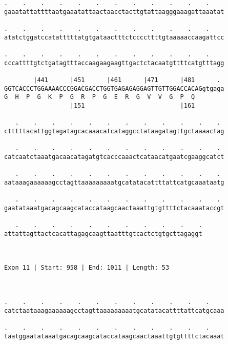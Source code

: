 \documentclass{article}
\begin{document}
\begin{Verbatim}
.    .    .    .    .    .    .    .    .    .    .    .    
gaaatattattttaatgaaatattaactaacctacttgtattaagggaaagattaaatat
                                                            
.    .    .    .    .    .    .    .    .    .    .    .    
atatctggatccatatttttatgtgataactttctccccttttgtaaaaaccaagattcc
                                                            
.    .    .    .    .    .    .    .    .    .    .    .    
cccattttgtctgatagtttaccaagaagaagttgactctacaatgttttcatgtttagg
                                                            
        |441      |451      |461      |471      |481      . 
GGTCACCCTGGAAAACCCGGACGACCTGGTGAGAGAGGAGTTGTTGGACCACAGgtgaga
G  H  P  G  K  P  G  R  P  G  E  R  G  V  V  G  P  Q        
                  |151                          |161        
  
   .    .    .    .    .    .    .    .    .    .    .    . 
ctttttacattggtagatagcacaaacatcataggcctataagatagttgctaaaactag
                                                            
   .    .    .    .    .    .    .    .    .    .    .    . 
catcaatctaaatgacaacatagatgtcacccaaactcataacatgaatcgaaggcatct
                                                            
   .    .    .    .    .    .    .    .    .    .    .    . 
aataaagaaaaaagcctagttaaaaaaaaatgcatatacattttattcatgcaaataatg
                                                            
   .    .    .    .    .    .    .    .    .    .    .    . 
gaatataaatgacagcaagcataccataagcaactaaattgtgttttctacaaataccgt
                                                            
   .    .    .    .    .    .    .    .    .    .    .
attattagttactcacattagagcaagttaatttgtcactctgtgcttagaggt
                                                      
                                                      
 
Exon 11 | Start: 958 | End: 1011 | Length: 53



.    .    .    .    .    .    .    .    .    .    .    .    
catctaataaagaaaaaagcctagttaaaaaaaaatgcatatacattttattcatgcaaa
                                                            
.    .    .    .    .    .    .    .    .    .    .    .    
taatggaatataaatgacagcaagcataccataagcaactaaattgtgttttctacaaat
                                                            

\end{Verbatim}
\end{document}
